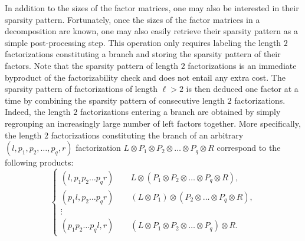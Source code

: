 \documentclass{article}
\numberwithin{equation}{section}
\theoremstyle{definition}
\begin{document}
In addition to the sizes of the factor matrices, one may also be interested in their sparsity pattern. Fortunately, once the sizes of the factor matrices in a decomposition are known, one may also easily retrieve their sparsity pattern as a simple post-processing step. This operation only requires labeling the length $2$ factorizations constituting a branch and storing the sparsity pattern of their factors. Note that the sparsity pattern of length $2$ factorizations is an immediate byproduct of the factorizability check and does not entail any extra cost. The sparsity pattern of factorizations of length $\ell > 2$ is then deduced one factor at a time by combining the sparsity pattern of consecutive length $2$ factorizations. Indeed, the length $2$ factorizations entering a branch are obtained by simply regrouping an increasingly large number of left factors together. More specifically, the length $2$ factorizations constituting the branch of an arbitrary $(l,p_1,p_2,\dots,p_q,r)$ factorization $L \otimes P_1 \otimes P_2 \otimes \dots \otimes P_q \otimes R$ correspond to the following products:
\begin{equation*}
    \begin{cases}
        (l, p_1p_2\dots p_q r) \qquad L \otimes (P_1 \otimes P_2 \otimes \dots \otimes P_q \otimes R),\\
        (p_1l, p_2\dots p_q r) \qquad (L \otimes P_1) \otimes (P_2 \otimes \dots \otimes P_q \otimes R),\\
        \vdots \\
        (p_1 p_2 \dots p_q l, r) \qquad (L \otimes P_1 \otimes P_2 \otimes \dots \otimes P_q) \otimes R.
    \end{cases}
\end{equation*}
\end{document}
